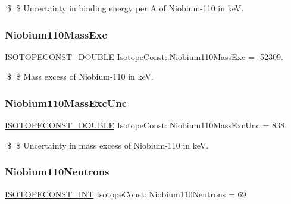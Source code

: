 \$ \$ Uncertainty in binding energy per A of Niobium-\/110 in keV. \mbox{\label{group___isotope_const-_niobium-_nb110_gade430c9bfde57330bdc0905afdcba0ee}} 
\subsubsection{\texorpdfstring{Niobium110\+Mass\+Exc}{Niobium110MassExc}}
{\footnotesize\ttfamily \mbox{\hyperlink{group___isotope_const-_macros_ga8f45a7272ce02c0b4c65c44636ed719a}{I\+S\+O\+T\+O\+P\+E\+C\+O\+N\+S\+T\+\_\+\+D\+O\+U\+B\+LE}} Isotope\+Const\+::\+Niobium110\+Mass\+Exc = -\/52309.}

\$ \$ Mass excess of Niobium-\/110 in keV. \mbox{\label{group___isotope_const-_niobium-_nb110_ga18358f3f5452e1b60d912dc06c77c717}} 
\subsubsection{\texorpdfstring{Niobium110\+Mass\+Exc\+Unc}{Niobium110MassExcUnc}}
{\footnotesize\ttfamily \mbox{\hyperlink{group___isotope_const-_macros_ga8f45a7272ce02c0b4c65c44636ed719a}{I\+S\+O\+T\+O\+P\+E\+C\+O\+N\+S\+T\+\_\+\+D\+O\+U\+B\+LE}} Isotope\+Const\+::\+Niobium110\+Mass\+Exc\+Unc = 838.}

\$ \$ Uncertainty in mass excess of Niobium-\/110 in keV. \mbox{\label{group___isotope_const-_niobium-_nb110_ga8e05dfd36b806830291a75244993e925}} 
\subsubsection{\texorpdfstring{Niobium110\+Neutrons}{Niobium110Neutrons}}
{\footnotesize\ttfamily \mbox{\hyperlink{group___isotope_const-_macros_ga5f18360b3e99483a35c32d789e62621c}{I\+S\+O\+T\+O\+P\+E\+C\+O\+N\+S\+T\+\_\+\+I\+NT}} Isotope\+Const\+::\+Niobium110\+Neutrons = 69}

